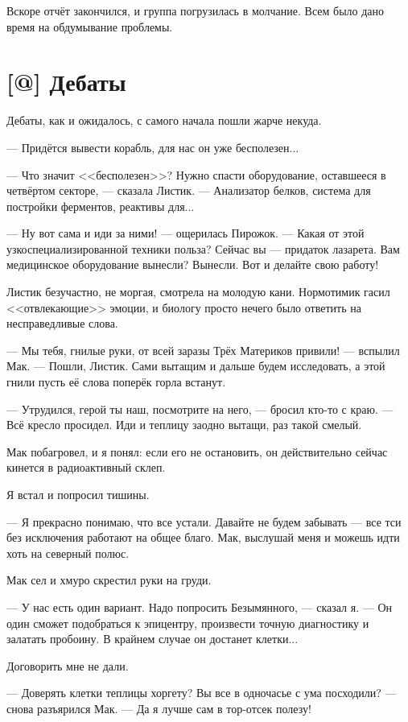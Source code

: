 Вскоре отчёт закончился, и группа погрузилась в молчание.
Всем было дано время на обдумывание проблемы.

\section{[@] Дебаты}

Дебаты, как и ожидалось, с самого начала пошли жарче некуда.

--- Придётся вывести корабль, для нас он уже бесполезен...

--- Что значит <<бесполезен>>?
Нужно спасти оборудование, оставшееся в четвёртом секторе, --- сказала Листик.
--- Анализатор белков, система для постройки ферментов, реактивы для...

--- Ну вот сама и иди за ними! --- ощерилась Пирожок.
--- Какая от этой узкоспециализированной техники польза?
Сейчас вы --- придаток лазарета.
Вам медицинское оборудование вынесли?
Вынесли.
Вот и делайте свою работу!

Листик безучастно, не моргая, смотрела на молодую кани.
Нормотимик гасил <<отвлекающие>> эмоции, и биологу просто нечего было ответить на несправедливые слова.

--- Мы тебя, гнилые руки, от всей заразы Трёх Материков привили! --- вспылил Мак.
--- Пошли, Листик.
Сами вытащим и дальше будем исследовать, а этой гнили пусть её слова поперёк горла встанут.

--- Утрудился, герой ты наш, посмотрите на него, --- бросил кто-то с краю.
--- Всё кресло просидел.
Иди и теплицу заодно вытащи, раз такой смелый.

Мак побагровел, и я понял: если его не остановить, он действительно сейчас кинется в радиоактивный склеп.

Я встал и попросил тишины.

--- Я прекрасно понимаю, что все устали.
Давайте не будем забывать --- все тси без исключения работают на общее благо.
Мак, выслушай меня и можешь идти хоть на северный полюс.

Мак сел и хмуро скрестил руки на груди.

--- У нас есть один вариант.
Надо попросить Безымянного, --- сказал я.
--- Он один сможет подобраться к эпицентру, произвести точную диагностику и залатать пробоину.
В крайнем случае он достанет клетки...

Договорить мне не дали.

--- Доверять клетки теплицы хоргету?
Вы все в одночасье с ума посходили? --- снова разъярился Мак.
--- Да я лучше сам в тор-отсек полезу!

